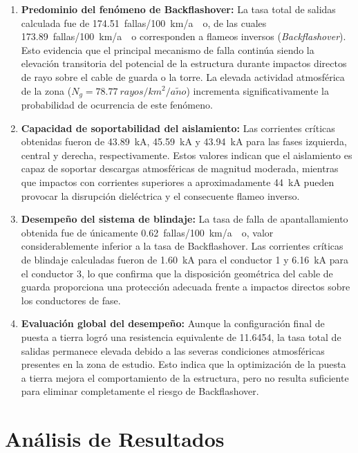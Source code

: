 \documentclass[12pt,letterpaper]{article}
\begin{document}
\begin{enumerate}
	\item \textbf{Predominio del fenómeno de Backflashover:} La tasa total de salidas calculada fue de \SI{174.51}{fallas/100.\km/ao}, de las cuales \SI{173.89}{fallas/100.\km/ao} corresponden a flameos inversos (\textit{Backflashover}). Esto evidencia que el principal mecanismo de falla continúa siendo la elevación transitoria del potencial de la estructura durante impactos directos de rayo sobre el cable de guarda o la torre. La elevada actividad atmosférica de la zona ($N_g=\SI{78.77}{rayos/km^2/a\tilde{n}o}$) incrementa significativamente la probabilidad de ocurrencia de este fenómeno.
	
	\item \textbf{Capacidad de soportabilidad del aislamiento:} Las corrientes críticas obtenidas fueron de \SI{43.89}{\kA}, \SI{45.59}{\kA} y \SI{43.94}{\kA} para las fases izquierda, central y derecha, respectivamente. Estos valores indican que el aislamiento es capaz de soportar descargas atmosféricas de magnitud moderada, mientras que impactos con corrientes superiores a aproximadamente \SI{44}{\kA} pueden provocar la disrupción dieléctrica y el consecuente flameo inverso.
	
	\item \textbf{Desempeño del sistema de blindaje:} La tasa de falla de apantallamiento obtenida fue de únicamente \SI{0.62}{fallas/100.\km/ao}, valor considerablemente inferior a la tasa de Backflashover. Las corrientes críticas de blindaje calculadas fueron de \SI{1.60}{\kA} para el conductor 1 y \SI{6.16}{\kA} para el conductor 3, lo que confirma que la disposición geométrica del cable de guarda proporciona una protección adecuada frente a impactos directos sobre los conductores de fase.
	
	\item \textbf{Evaluación global del desempeño:} Aunque la configuración final de puesta a tierra logró una resistencia equivalente de \SI{11.6454}{\Omega}, la tasa total de salidas permanece elevada debido a las severas condiciones atmosféricas presentes en la zona de estudio. Esto indica que la optimización de la puesta a tierra mejora el comportamiento de la estructura, pero no resulta suficiente para eliminar completamente el riesgo de Backflashover.
\end{enumerate}



\section{Análisis de Resultados}
\end{document}
